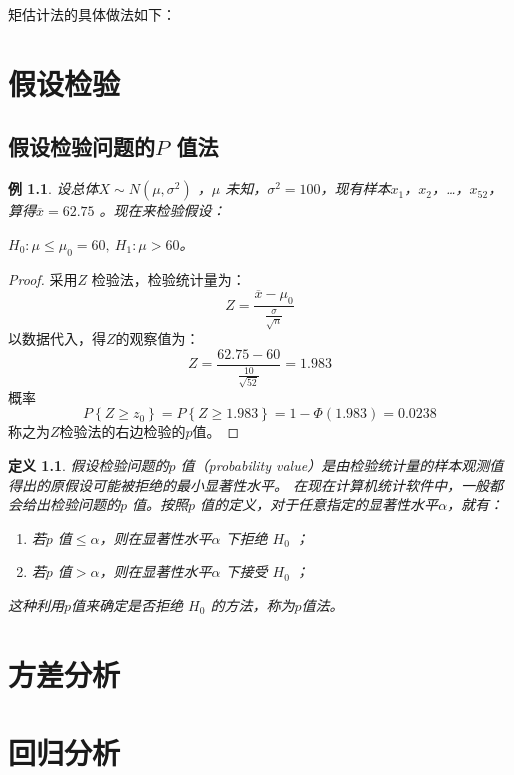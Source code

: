 \documentclass[11pt]{book}
\newtheorem{exercise}{\hspace{2em}\textbf{例}}[section]
\newtheorem{definition}{\hspace{2em}\textbf{定义}}
\begin{document}
矩估计法的具体做法如下：






	\chapter{假设检验}
	\section{假设检验问题的$ P $ 值法}
	\begin{exercise}
	设总体$ X \sim N(\mu ,\sigma ^{2})$ ，$ \mu $ 未知，$ \sigma ^{2}=100 $，现有样本$ x_1 $，$ x_2 $，\dots ，$ x_{52} $，算得$ \overline{x} = 62.75$ 。现在来检验假设：
	\begin{center}
		$ H_0:\mu \le \mu _0=60,\ H_1 :\mu >60 $。
	\end{center}
\end{exercise}

\begin{proof}
	采用$ Z $ 检验法，检验统计量为：
	\begin{equation*}
		Z=\frac{\overline{x} - \mu_0}{\frac{\sigma}{\sqrt{n}}}
	\end{equation*}
	以数据代入，得$Z$的观察值为：
	\begin{equation*}
		Z=\frac{62.75 - 60}{\frac{10}{\sqrt{52}}}=1.983
	\end{equation*}
	概率
	\begin{equation*}
		P\left\lbrace Z \ge z_0\right\rbrace =P\left\lbrace Z\ge1.983\right\rbrace =1-\Phi(1.983)=0.0238
	\end{equation*}
	称之为$Z$检验法的右边检验的$p$值。
\end{proof}
\begin{definition}
	假设检验问题的$ p $ 值（probability value）是由检验统计量的样本观测值得出的原假设可能被拒绝的最小显著性水平。
	在现在计算机统计软件中，一般都会给出检验问题的$ p $ 值。按照$ p $ 值的定义，对于任意指定的显著性水平$ \alpha $，就有：
	
	\begin{enumerate}
		\item 若$ p $ 值$ \le \alpha $，则在显著性水平$ \alpha $ 下拒绝 $ H_0 $ ；
		\item 若$ p $ 值$ > \alpha $，则在显著性水平$ \alpha $ 下接受 $ H_0 $ ；
	\end{enumerate}
这种利用$p$值来确定是否拒绝 $ H_0 $ 的方法，称为$p$值法。
\end{definition}


	\chapter{方差分析}
	\chapter{回归分析}
	
	
\end{document}
